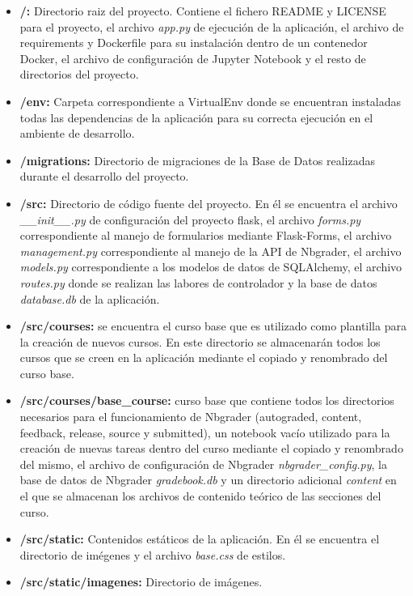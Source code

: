 \begin{itemize}
\tightlist
\item \textbf{/:} Directorio raiz del proyecto. Contiene el fichero README y LICENSE para el proyecto, el archivo \textit{app.py} de ejecución de la aplicación, el archivo de requirements y Dockerfile para su instalación dentro de un contenedor Docker, el archivo de configuración de Jupyter Notebook y el resto de directorios del proyecto.
\item \textbf{/env:} Carpeta correspondiente a VirtualEnv donde se encuentran instaladas todas las dependencias de la aplicación para su correcta ejecución en el ambiente de desarrollo.
\item \textbf{/migrations:} Directorio de migraciones de la Base de Datos realizadas durante el desarrollo del proyecto.
\item \textbf{/src:} Directorio de código fuente del proyecto. En él se encuentra el archivo \textit{\_\_init\_\_.py} de configuración del proyecto flask, el archivo \textit{forms.py} correspondiente al manejo de formularios mediante Flask-Forms, el archivo \textit{management.py} correspondiente al manejo de la API de Nbgrader, el archivo \textit{models.py} correspondiente a los modelos de datos de SQLAlchemy, el archivo \textit{routes.py} donde se realizan las labores de controlador y la base de datos \textit{database.db} de la aplicación.
\item \textbf{/src/courses:} se encuentra el curso base que es utilizado como plantilla para la creación de nuevos cursos. En este directorio se almacenarán todos los cursos que se creen en la aplicación mediante el copiado y renombrado del curso base.
\item \textbf{/src/courses/base\_course:} curso base que contiene todos los directorios necesarios para el funcionamiento de Nbgrader (autograded, content, feedback, release, source y submitted), un notebook vacío utilizado para la creación de nuevas tareas dentro del curso mediante el copiado y renombrado del mismo, el archivo de configuración de Nbgrader \textit{nbgrader\_config.py}, la base de datos de Nbgrader \textit{gradebook.db} y un directorio adicional \textit{content} en el que se almacenan los archivos de contenido teórico de las secciones del curso.
\item \textbf{/src/static:} Contenidos estáticos de la aplicación. En él se encuentra el directorio de imégenes y el archivo \textit{base.css} de estilos.
\item \textbf{/src/static/imagenes:} Directorio de imágenes.

\end{itemize}

